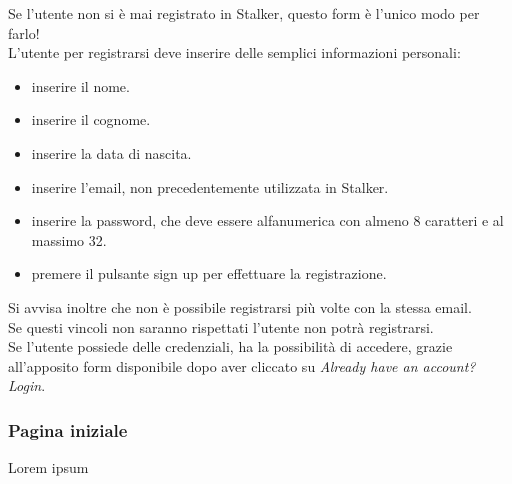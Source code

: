 \documentclass[../manuale-utente.tex]{subfiles}
\begin{document}
Se l'utente non si è mai registrato in Stalker, questo form è l'unico modo per farlo!\\
L'utente per registrarsi deve inserire delle semplici informazioni personali:

\begin{itemize}
    \item inserire il nome.
    \item inserire il cognome.
    \item inserire la data di nascita.
    \item inserire l'email, non precedentemente utilizzata in Stalker.
    \item inserire la password, che deve essere alfanumerica con almeno 8 caratteri e al massimo 32.
    \item premere il pulsante sign up per effettuare la registrazione.
\end{itemize}

Si avvisa inoltre che non è possibile registrarsi più volte con la stessa email.\\
Se questi vincoli non saranno rispettati l'utente non potrà registrarsi.\\
Se l'utente possiede delle credenziali, ha la possibilità di accedere, grazie all'apposito form disponibile dopo aver cliccato su \textit{Already have an account? Login}.
\newpage

\subsubsection{Pagina iniziale}%
\label{sub:pagina_iniziale}


Lorem ipsum

\end{document}
